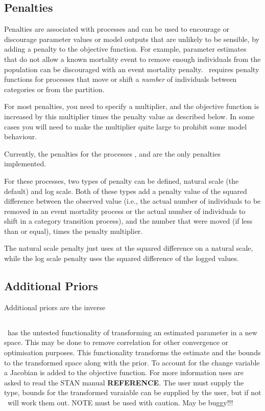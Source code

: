 \subsection{Penalties\label{sec:penalties}}
Penalties are associated with processes and can be used to encourage or discourage parameter values or model outputs that are unlikely to be sensible, by adding a penalty to the objective function. For example, parameter estimates that do not allow a known mortality event to remove enough individuals from the population can be discouraged with an event mortality penalty. \CNAME\ requires penalty functions for processes that move or shift a \emph{number} of individuals between categories or from the partition.

For most penalties, you need to specify a multiplier, and the objective function is increased by this multiplier times the penalty value as described below. In some cases you will need to make the multiplier quite large to prohibit some model behaviour. 

Currently, the penalties for the processes ,  and  are the only penalties implemented. 

For these processes, two types of penalty can be defined, natural scale (the default) and log scale. Both of these types add a penalty value of the squared difference between the observed value (i.e., the actual number of individuals to be removed in an event mortality process or the actual number of individuals to shift in a category transition process), and the number that were moved (if less than or equal), times the penalty multiplier.

The natural scale penalty just uses at the squared difference on a natural scale, while the log scale penalty uses the squared difference of the logged values. 

\subsection{Additional Priors\label{sec:additional_priors}}
Additional priors are the inverse 


\subsection{\label{sec:transformations}}

\CNAME\ has the untested functionality of transforming an estimated parameter in a new space. This may be done to remove correlation for other convergence or optimisation purposes. This functionality transforms the estimate and the bounds to the transformed space along with the prior. To account for the change variable a Jacobian is added to the objective function. For more information uses are asked to read the STAN manual \textbf{REFERENCE}. The user must supply the type, bounds for the transformed varaiable can be supplied by the user, but if not \CNAME\ will work them out. NOTE must be used with caution. May be buggy!!!

